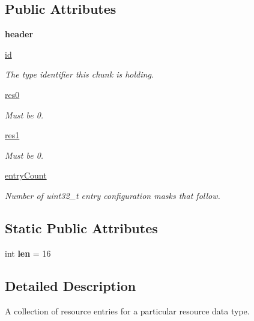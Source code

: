 \subsection*{Public Attributes}
\begin{DoxyCompactItemize}
\item 
\mbox{\label{classtype_1_1ResTable__type__header_a579fe21cde94e89d87e1b765a4ce6c43}} 
{\bfseries header}
\item 
\mbox{\hyperlink{classtype_1_1ResTable__type__header_adee0d1631145504aa375f9c1cefef1bf}{id}}
\begin{DoxyCompactList}\small\item\em The type identifier this chunk is holding. \end{DoxyCompactList}\item 
\mbox{\hyperlink{classtype_1_1ResTable__type__header_a067afa789aff346656808f653a5888d3}{res0}}
\begin{DoxyCompactList}\small\item\em Must be 0. \end{DoxyCompactList}\item 
\mbox{\hyperlink{classtype_1_1ResTable__type__header_a8c51b10f036c581084351d47e34d3e01}{res1}}
\begin{DoxyCompactList}\small\item\em Must be 0. \end{DoxyCompactList}\item 
\mbox{\hyperlink{classtype_1_1ResTable__type__header_a5c2cd8db150389cf7996622a8074b309}{entry\+Count}}
\begin{DoxyCompactList}\small\item\em Number of uint32\+\_\+t entry configuration masks that follow. \end{DoxyCompactList}\end{DoxyCompactItemize}
\subsection*{Static Public Attributes}
\begin{DoxyCompactItemize}
\item 
\mbox{\label{classtype_1_1ResTable__type__header_acc52c1f7500dfaf40a7e1ca88f817857}} 
int {\bfseries len} = 16
\end{DoxyCompactItemize}


\subsection{Detailed Description}
A collection of resource entries for a particular resource data type. 

